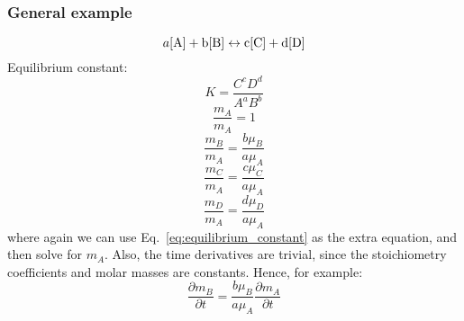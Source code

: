 \subsubsection{General example}
\label{sec:general_reaction}
\begin{equation}
    a[\rm{A}] + b[\rm{B}] \leftrightarrow c[\rm{C}] + d[\rm{D}]
    \label{eq:reaction_general}
\end{equation}
Equilibrium constant:
\begin{equation}
K = \frac{C^c D^d}{A^a B^b}
\label{eq:equilibrium_constant}
\end{equation}
\begin{equation}
\frac{m_{A}}{m_{A}} = 1
\end{equation}
\begin{equation}
\frac{m_{B}}{m_{A}} = \frac{b \mu_{B}}{a \mu_{A} }
\end{equation}
\begin{equation}
\frac{m_{C}}{m_{A}} = \frac{c \mu_{C}}{a \mu_{A} }
\end{equation}
\begin{equation}
\frac{m_{D}}{m_{A}} = \frac{d \mu_{D}}{a \mu_{A} }
\end{equation}
where again we can use Eq.~\ref{eq:equilibrium_constant} as the extra equation, and then solve for $m_A$.  Also, the time derivatives are trivial, since the stoichiometry coefficients and molar masses are constants.  Hence, for example:
\begin{equation}
\frac{\partial m_B}{\partial t} = \frac{b \mu_{B}}{a \mu_{A} } \frac{\partial m_A}{\partial t}
\end{equation}
